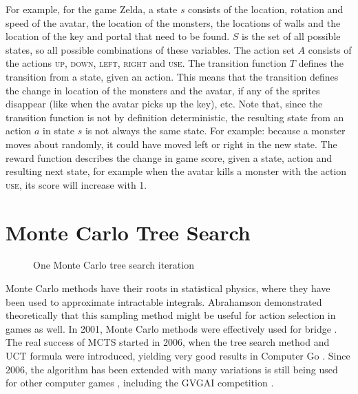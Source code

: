 For example, for the game Zelda, a state $s$ consists of the location, rotation
and speed of the avatar, the location of the monsters, the locations of walls
and the location of the key and portal that need to be found. $S$ is the set of
all possible states, so all possible combinations of these variables. The action
set $A$ consists of the actions \textsc{up}, \textsc{down}, \textsc{left},
\textsc{right} and \textsc{use}. The transition function $T$ defines the
transition from a state, given an action. This means that the transition defines
the change in location of the monsters and the avatar, if any of the sprites
disappear (like when the avatar picks up the key), etc. Note that, since the
transition function is not by definition deterministic, the resulting state from
an action $a$ in state $s$ is not always the same state. For example: because a
monster moves about randomly, it could have moved left or right in the new
state. The reward function describes the change in game score, given a state,
action and resulting next state, for example when the avatar kills a monster
with the action \textsc{use}, its score will increase with 1.

\section{Monte Carlo Tree Search}
\begin{figure}
	\centering
	\caption{One Monte Carlo tree search iteration}
	\label{fig:mcts}
\end{figure}

\label{subsec:mcts}
Monte Carlo methods have their roots in statistical physics, where they have
been used to approximate intractable integrals. Abrahamson
\cite{abramson1990expected} demonstrated theoretically that this sampling method
might be useful for action selection in games as well.  In 2001, Monte Carlo
methods were effectively used for bridge \cite{ginsberg2001gib}. The real
success of MCTS started in 2006, when the tree search method and UCT formula
were introduced, yielding very good results in Computer Go
\cite{gelly2006modification}. Since 2006, the algorithm has been extended with
many variations is still being used for other computer games
\cite{browne2012survey}, including the GVGAI competition
\cite{perez2014knowledge}.

